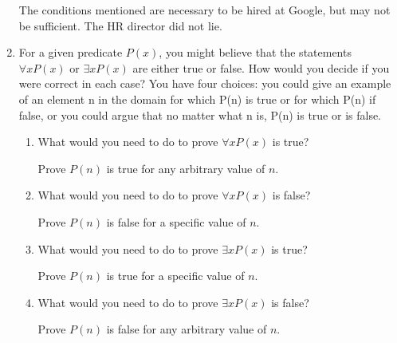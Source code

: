 \documentclass[11pt, letterpaper, includehead]{article}
\begin{document}
\begin{enumerate}[label=\textbf{\arabic*}.]
The conditions mentioned are necessary to be hired at Google, but may not be sufficient. The HR director did not lie.



\item For a given predicate $P(x)$, you might believe that the statements $\forall x P(x)$ or $\exists x P(x)$ are either true or false.
How would you decide if you were correct in each case? You have four choices: you could give an example of an element n in the domain for which P(n) is true or for which P(n) if false,
or you could argue that no matter what n is, P(n) is true or is false.

\begin{enumerate}[label= (\alph*)]
    \item What would you need to do to prove $\forall xP(x)$ is true?

    Prove $P(n)$ is true for any arbitrary value of $n$.
    \item What would you need to do to prove $\forall xP(x)$ is false?

    Prove $P(n)$ is false for a specific value of $n$.

    \item What would you need to do to prove $\exists xP(x)$ is true?  

    Prove $P(n)$ is true for a specific value of $n$.
    \item What would you need to do to prove $\exists xP(x)$ is false?

    Prove $P(n)$ is false for any arbitrary value of $n$.
\end{enumerate}

\end{enumerate}
\end{document}
